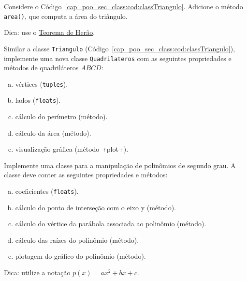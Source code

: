 \begin{exer}
  Considere o Código~\ref{cap_poo_sec_class:cod:classTriangulo}. Adicione o método \lstinline+area()+, que computa a área do triângulo.
\end{exer}
\begin{resp}
  Dica: use o \href{https://pt.wikipedia.org/wiki/Teorema_de_Her%C3%A3o}{Teorema de Herão}.
\end{resp}

\begin{exer}
  Similar a classe \lstinline+Triangulo+ (Código~\ref{cap_poo_sec_class:cod:classTriangulo}), implemente uma nova classe \lstinline+Quadrilateros+ com as seguintes propriedades e métodos de quadriláteros $ABCD$:
  \begin{enumerate}[a)]
  \item vértices (\lstinline+tuples+).
  \item lados (\lstinline+floats+).
  \item cálculo do perímetro (método).
  \item cálculo da área (método).
  \item visualização gráfica (método \textit+plot+).
  \end{enumerate}
\end{exer}

\begin{exer}
  Implemente uma classe para a manipulação de polinômios de segundo grau. A classe deve conter as seguintes propriedades e métodos:
  \begin{enumerate}[a)]
  \item coeficientes (\lstinline+floats+).
  \item cálculo do ponto de interseção com o eixo y (método).
  \item cálculo do vértice da parábola associada ao polinômio (método).
  \item cálculo das raízes do polinômio (método).
  \item plotagem do gráfico do polinômio (método).
  \end{enumerate}
\end{exer}
\begin{resp}
  Dica: utilize a notação $p(x) = ax^2 + bx + c$.
\end{resp}
  

